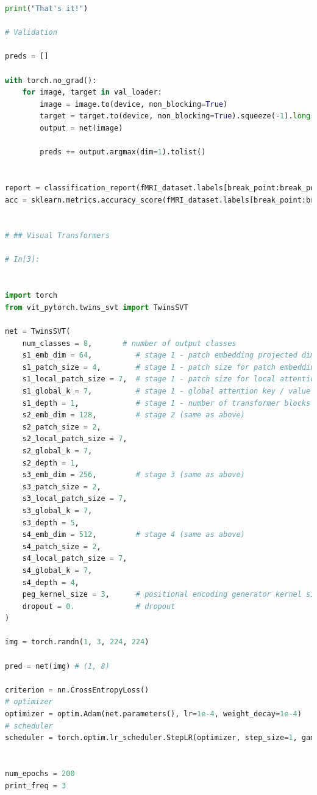 \documentclass[10pt, twocolumn, letterpaper]{article}
\begin{document}
\begin{lstlisting}[language=Python]
print("That's it!")

# Validation

preds = []

with torch.no_grad():
    for image, target in val_loader:
        image = image.to(device, non_blocking=True)
        target = target.to(device, non_blocking=True).squeeze(-1).long()
        output = net(image)

        preds += output.argmax(dim=1).tolist()
        
        
report = classification_report(fMRI_dataset.labels[break_point:break_point+len(preds)], preds, target_names=list(stimuli2category.keys()), digits=4)
acc = sklearn.metrics.accuracy_score(fMRI_dataset.labels[break_point:break_point+len(preds)], preds)


# ## Visual Transformers 

# In[3]:


import torch
from vit_pytorch.twins_svt import TwinsSVT

net = TwinsSVT(
    num_classes = 8,       # number of output classes
    s1_emb_dim = 64,          # stage 1 - patch embedding projected dimension
    s1_patch_size = 4,        # stage 1 - patch size for patch embedding
    s1_local_patch_size = 7,  # stage 1 - patch size for local attention
    s1_global_k = 7,          # stage 1 - global attention key / value reduction factor, defaults to 7 as specified in paper
    s1_depth = 1,             # stage 1 - number of transformer blocks (local attn -> ff -> global attn -> ff)
    s2_emb_dim = 128,         # stage 2 (same as above)
    s2_patch_size = 2,
    s2_local_patch_size = 7,
    s2_global_k = 7,
    s2_depth = 1,
    s3_emb_dim = 256,         # stage 3 (same as above)
    s3_patch_size = 2,
    s3_local_patch_size = 7,
    s3_global_k = 7,
    s3_depth = 5,
    s4_emb_dim = 512,         # stage 4 (same as above)
    s4_patch_size = 2,
    s4_local_patch_size = 7,
    s4_global_k = 7,
    s4_depth = 4,
    peg_kernel_size = 3,      # positional encoding generator kernel size
    dropout = 0.              # dropout
)

img = torch.randn(1, 3, 224, 224)

pred = net(img) # (1, 8)

criterion = nn.CrossEntropyLoss()
# optimizer
optimizer = optim.Adam(net.parameters(), lr=1e-4, weight_decay=1e-4)
# scheduler
scheduler = torch.optim.lr_scheduler.StepLR(optimizer, step_size=1, gamma = 0.8)


num_epochs = 200
print_freq = 3


\end{lstlisting}
\end{document}
